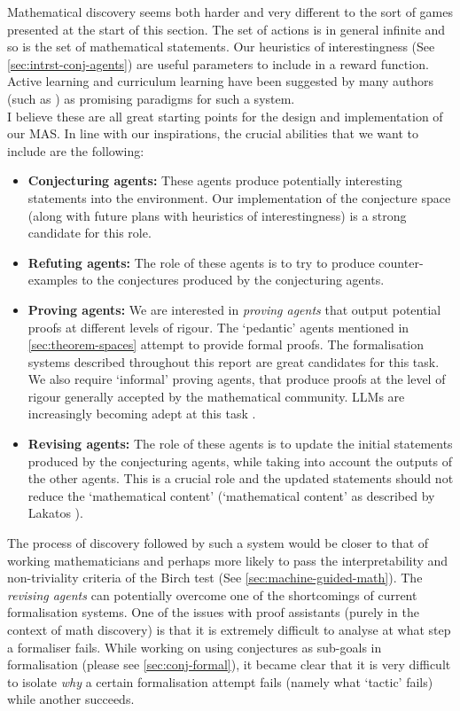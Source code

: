 Mathematical discovery seems both harder and very different to the sort of games presented at the start of this section. The set of actions is in general infinite and so is the set of mathematical statements. Our heuristics of interestingness (See \ref{sec:intrst-conj-agents}) are useful parameters to include in a reward function. Active learning \cite{activeLeanringSurvey} and curriculum learning \cite{curriculumMath2023} have been suggested by many authors (such as \citeauthor{bengioMachineLearningInformation2024}) as promising paradigms for such a system.
\\ I believe these are all great starting points for the design and implementation of our MAS. In line with our inspirations, the crucial abilities that we want to include are the following:
\begin{itemize}
    \item \textbf{Conjecturing agents:} These agents produce potentially interesting statements into the environment. Our implementation of the conjecture space (along with future plans with heuristics of interestingness) is a strong candidate for this role.
    \item \textbf{Refuting agents:} The role of these agents is to try to produce counter-examples to the conjectures produced by the conjecturing agents.
    \item \textbf{Proving agents:} We are interested in \textit{proving agents} that output potential proofs at different levels of rigour. The `pedantic' agents mentioned in \ref{sec:theorem-spaces} attempt to provide formal proofs. The formalisation systems described throughout this report are great candidates for this task. We also require `informal' proving agents, that produce proofs at the level of rigour generally accepted by the mathematical community. LLMs are increasingly becoming adept at this task \cite{jiangDraftSketchProve2023, wuAutoformalizationLargeLanguage}.
    \item \textbf{Revising agents:} The role of these agents is to update the initial statements produced by the conjecturing agents, while taking into account the outputs of the other agents. This is a crucial role and the updated statements should not reduce the `mathematical content' (`mathematical content' as described by Lakatos \cite{Lakatos_Worrall_Zahar_1976}).
\end{itemize}
The process of discovery followed by such a system would be closer to that of working mathematicians and perhaps more likely to pass the interpretability and non-triviality criteria of the Birch test (See \ref{sec:machine-guided-math}). The \textit{revising agents} can potentially overcome one of the shortcomings of current formalisation systems. One of the issues with proof assistants (purely in the context of math discovery) is that it is extremely difficult to analyse at what step a formaliser fails. While working on using conjectures as sub-goals in formalisation (please see \ref{sec:conj-formal}), it became clear that it is very difficult to isolate \textit{why} a certain formalisation attempt fails (namely what `tactic' fails) while another succeeds.
